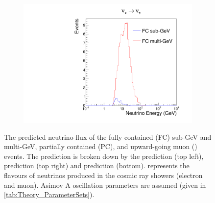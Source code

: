 \begin{figure}[h]
\begin{subfigure}[t]{0.49\textwidth}
    \includegraphics[width=\textwidth, trim={0mm 0mm 0mm 0mm}, clip,page=1]{Figures/Simulations/NeutrinoEnergyDist_NuTau.pdf}
  \end{subfigure}%
  \caption{The predicted neutrino flux of the fully contained (FC) sub-GeV and multi-GeV, partially contained (PC), and upward-going muon () events. The prediction is broken down by the  prediction (top left),  prediction (top right) and  prediction (bottom).  represents the flavours of neutrinos produced in the cosmic ray showers (electron and muon). Asimov A oscillation parameters are assumed (given in \autoref{tab:Theory_ParameterSets}).}
  \label{fig:Simulations_NeutrinoEnergyDistribution}
\end{figure}

